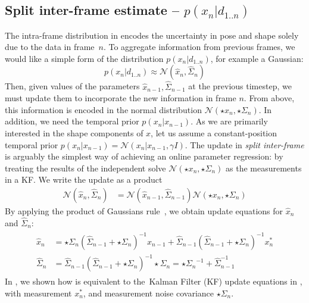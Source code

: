 \subsection{Split inter-frame estimate -- $p(x_n|d_{1..n})$}
\label{sec:split}
The intra-frame distribution in  encodes the uncertainty in pose and shape solely due to the data in frame~$n$.  To aggregate information from previous frames, we would like a simple form of the distribution $p(x_n|d_{1..n}) $, for example a Gaussian:
\begin{equation}
p(x_n|d_{1..n}) \approx \mathcal{N}(\hat{x}_n, \hat{\Sigma}_n)
\end{equation}
Then, given values of the parameters $\hat{x}_{n-1}, \hat{\Sigma}_{n-1}$ at the previous timestep, we must update them to incorporate the new information in frame $n$.   From above, this information is encoded in the normal distribution $\mathcal{N}(\star{x}_n, \star{\Sigma}_n)$.
% 
In addition, we need the temporal prior $p(x_n|x_{n-1})$.  As we are primarily interested in the shape components of $x$, let us assume a constant-position temporal prior $p(x_n|x_{n-1}) = \mathcal N(x_n | x_{n-1}, \gamma I)$.
% 
% 
The update in {\em split inter-frame} is arguably the simplest way of achieving an online parameter regression: by treating the results of the independent solve $\mathcal{N}(\star{x}_n, \star{\Sigma}_n)$ as the measurements in a KF.  We write the update as a product
% 
\begin{align}
\mathcal{N}(\hat{x}_n, \hat{\Sigma}_n) &= \mathcal{N}(\hat{x}_{n-1}, \hat{\Sigma}_{n-1}) \mathcal{N}(\star{x}_n, \star{\Sigma}_n)
\end{align}
By applying the product of Gaussians rule~\cite{petersen2008matrix}, we obtain update equations for $\hat{x}_n$ and $\hat{\Sigma}_n$:
% 
\begin{align}
\begin{split}
\hat{x}_{n} &= \star\Sigma_{n} (\hat{\Sigma}_{n-1} + \star\Sigma_{n})^{-1} \hat{x}_{n-1} + 
\hat{\Sigma}_{n-1} (\hat{\Sigma}_{n-1} + \star\Sigma_n)^{-1} x_n^*
\\
\hat{\Sigma}_n &= \hat{\Sigma}_{n-1} (\hat{\Sigma}_{n-1} + {\star\Sigma_n})^{-1} \star\Sigma_n = {\star{\Sigma}_n}^{-1} + \hat{\Sigma}_{n-1}^{-1}
\label{eq:combining}
\end{split}
\end{align}
% 
In , we shown how  is equivalent to the~Kalman Filter (KF) update equations in , with measurement $x_n^*$, and measurement noise covariance $\star\Sigma_n$. 

